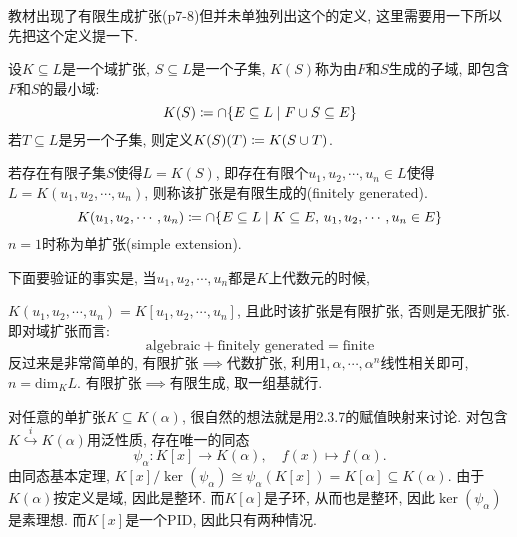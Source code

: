 \documentclass{../solutions-cn}
\begin{document}
\begin{remark}
    教材出现了有限生成扩张(p7-8)但并未单独列出这个的定义, 这里需要用一下所以先把这个定义提一下.

    \begin{defstar}
        设$K \subseteq L$是一个域扩张, $S \subseteq L$是一个子集, $K(S)$称为由$F$和$S$生成的子域, 即包含$F$和$S$的最小域:
        \[
            K(S) \mathrel{\coloneqq} \cap \{E \subseteq L \mid F \cup S \subseteq E\} 
        \]
        若$T \subseteq L$是另一个子集, 则定义$K(S)(T) \mathrel{\coloneqq} K(S \cup T)$.

        若存在有限子集$S$使得$L = K(S)$, 即存在有限个$u_1, u_2, \cdots, u_n \in L$使得$L = K(u_1, u_2, \cdots, u_n)$, 则称该扩张是有限生成的(finitely generated).
        \[
            K(u_1, u_2, \cdots, u_n) \mathrel{\coloneqq} \cap \{E \subseteq L \mid K \subseteq E,\, u_1, u_2, \cdots, u_n \in E\}
        \]
        $n = 1$时称为单扩张(simple extension).
    \end{defstar}
    下面要验证的事实是, 当$u_1, u_2, \cdots, u_n$都是$K$上代数元的时候,\par
    $K(u_1, u_2, \cdots, u_n) = K[u_1, u_2, \cdots, u_n]$, 且此时该扩张是有限扩张, 否则是无限扩张. 即对域扩张而言:
    \[
        \text{algebraic} + \text{finitely generated} = \text{finite}
    \]
    反过来是非常简单的, 有限扩张$\implies$代数扩张, 利用$1, \alpha, \cdots, \alpha^n$线性相关即可, $n = \mathrm{dim}_K L$. 有限扩张$\implies$有限生成, 取一组基就行.

    对任意的单扩张$K \subseteq K(\alpha)$, 很自然的想法就是用2.3.7的赋值映射来讨论. 对包含$K \overset{i}\hookrightarrow K(\alpha)$用泛性质, 存在唯一的同态 
    \[
        \psi_\alpha:K[x] \to K(\alpha),\quad f(x) \mapsto f(\alpha).
    \]
    由同态基本定理, $K[x]/\ker(\psi_\alpha) \cong \psi_\alpha(K[x]) = K[\alpha] \subseteq K(\alpha)$. 由于$K(\alpha)$按定义是域, 因此是整环. 而$K[\alpha]$是子环, 从而也是整环, 因此$\ker(\psi_\alpha)$是素理想. 而$K[x]$是一个PID, 因此只有两种情况.


\end{remark}
\end{document}
